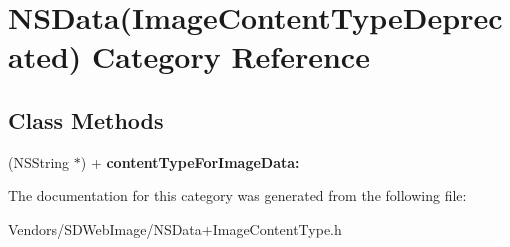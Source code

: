 \hypertarget{category_n_s_data_07_image_content_type_deprecated_08}{}\section{N\+S\+Data(Image\+Content\+Type\+Deprecated) Category Reference}
\label{category_n_s_data_07_image_content_type_deprecated_08}
\subsection*{Class Methods}
\begin{DoxyCompactItemize}
\item 
\hypertarget{category_n_s_data_07_image_content_type_deprecated_08_a4f4beecd8ec7bfb2beb63b33632d8024}{}(N\+S\+String $\ast$) + {\bfseries content\+Type\+For\+Image\+Data\+:}\label{category_n_s_data_07_image_content_type_deprecated_08_a4f4beecd8ec7bfb2beb63b33632d8024}

\end{DoxyCompactItemize}


The documentation for this category was generated from the following file\+:\begin{DoxyCompactItemize}
\item 
Vendors/\+S\+D\+Web\+Image/N\+S\+Data+\+Image\+Content\+Type.\+h\end{DoxyCompactItemize}
